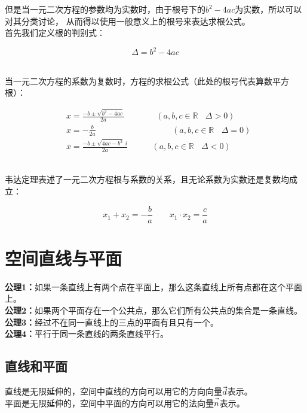\documentclass[UTF8]{ctexart}
\let\nvec\vec
\def\vec#1{\nvec{\vphantom b\smash{#1}}}
\begin{document}
    但是当一元二次方程的参数均为实数时，由于根号下的$b^2-4ac$为实数，所以可以对其分类讨论，
    从而得以使用一般意义上的根号来表达求根公式。\\[3mm]
    首先我们定义根的判别式：
    \begin{large}
        \begin{equation*}
            \Delta=b^2-4ac
        \end{equation*}
    \end{large}\\
    当一元二次方程的系数为复数时，方程的求根公式（此处的根号代表算数平方根）：\vspace{15pt}
    \begin{large}
        \begin{align*}
            &x=\frac{-b\pm\sqrt{b^2-4ac}}{2a}~~~~~~~~\qquad(a,b,c\in\mathbb{R}~~~~\Delta>0)\\[6mm]
            &x=-\frac{b}{2a}\qquad\qquad\qquad\qquad~~~~\:(a,b,c\in\mathbb{R}~~~~\Delta=0)\\[6mm]
            &x=\frac{-b\pm\sqrt{4ac-b^2}~i}{2a}\qquad~~~~(a,b,c\in\mathbb{R}~~~~\Delta<0)
        \end{align*}
    \end{large}\\[1mm]
    韦达定理表述了一元二次方程根与系数的关系，且无论系数为实数还是复数均成立：\vspace{10pt}
    \begin{large}
        \begin{equation*}
            x_1+x_2=-\frac{b}{a}\qquad x_1\cdot x_2=\frac{c}{a}
        \end{equation*}
    \end{large}    

\newpage

\section{空间直线与平面}
    \textbf{公理1：}如果一条直线上有两个点在平面上，那么这条直线上所有点都在这个平面上。\\[3mm]
    \textbf{公理2：}如果两个平面存在一个公共点，那么它们所有公共点的集合是一条直线。\\[3mm]
    \textbf{公理3：}经过不在同一直线上的三点的平面有且只有一个。\\[3mm]
    \textbf{公理4：}平行于同一条直线的两条直线平行。

\subsection{直线和平面}
    直线是无限延伸的，空间中直线的方向可以用它的方向向量$\vec{d}$表示。\\[3mm]
    平面是无限延伸的，空间中平面的方向可以用它的法向量$\vec{n}$表示。
\end{document}
